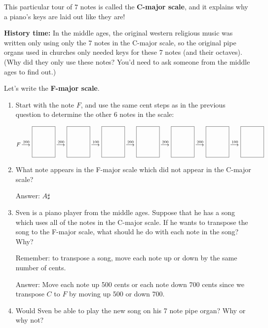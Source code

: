 \documentclass[12pt,noauthor,nooutcomes, instructornotes]{ximera}
\begin{document}
\begin{question}
\begin{enumerate}
This particular tour of $7$ notes is called the \textbf{C-major scale}, and it explains why a piano's keys are laid out like they are!

\textbf{History time:} In the middle ages, the original western religious music was written only using only the 7 notes in the C-major scale, so the original pipe organs used in churches only needed keys for these 7 notes (and their octaves).
(Why did they only use these notes? You'd need to ask someone from the middle ages to find out.)

\end{enumerate}
\end{question}

\begin{question}
Let's write the \textbf{F-major scale}.

\begin{enumerate}
\item Start with the note $F$, and use the same cent steps as in the previous question to determine the other 6 notes in the scale:

\[
F \lto^{200} \smallanswerbox \lto^{200} \smallanswerbox  \lto^{100} \smallanswerbox  \lto^{200} \smallanswerbox  \lto^{200} \smallanswerbox  \lto^{200} \smallanswerbox  \lto^{100} \smallanswerbox 
\]

\item What note appears in the F-major scale which did not appear in the C-major scale?

\begin{instructorNotes}
Answer: $A \sharp$
\end{instructorNotes}

\item Sven is a piano player from the middle ages. Suppose that he has a song which uses all of the notes in the C-major scale. If he wants to transpose the song to the F-major scale, what should he do with each note in the song? Why?

\begin{instructorNotes}
Remember: to transpose a song, move each note up or down by the same number of cents.

Answer: Move each note up 500 cents or each note down 700 cents since we transpose $C$ to $F$ by moving up 500 or down 700.
\end{instructorNotes}

\item Would Sven be able to play the new song on his 7 note pipe organ? Why or why not?


\end{enumerate}
\end{question}
\end{document}
